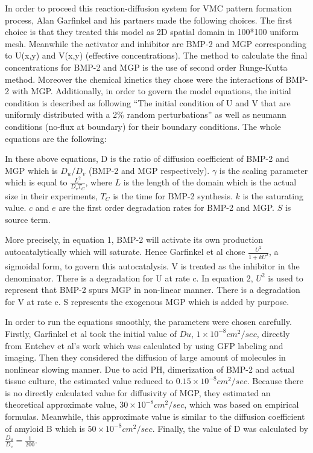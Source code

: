 \documentclass[12pt]{article}
\begin{document}
In order to proceed this reaction-diffusion system for VMC pattern formation process, Alan Garfinkel and his partners made the following choices. The first choice is that they treated this model as 2D spatial domain in 100*100 uniform mesh. Meanwhile the activator and inhibitor are BMP-2 and MGP corresponding to U(x,y) and V(x,y) (effective concentrations). The method to calculate the final concentrations for BMP-2 and MGP is the use of second order Runge-Kutta method. Moreover the chemical kinetics they chose were the interactions of BMP-2 with MGP. Additionally, in order to govern the model equations, the initial condition is described as following “The initial condition of U and V that are uniformly distributed with a 2\% random perturbations” as well as neumann conditions (no-flux at boundary) for their boundary conditions. The whole equations are the following:

In these above equations, D is the ratio of diffusion coefficient of BMP-2 and MGP which is $D_u / D_v$ (BMP-2 and MGP respectively). $\gamma$ is the scaling parameter which is equal to $\frac{L^2}{D_v T_C}$, where $L$ is the length of the domain which is the actual size in their experiments, $T_C$ is the time for BMP-2 synthesis. $k$ is the saturating value. $c$ and $e$ are the first order degradation rates for BMP-2 and MGP. $S$ is source term.

More precisely, in equation 1, BMP-2 will activate its own production autocatalytically which will saturate. Hence Garfinkel et al chose $\frac{U^2}{1+k U^2}$, a sigmoidal form, to govern this autocatalysis. V is treated as the inhibitor in the denominator. There is a degradation for U at rate c. In equation 2, $U^2$ is used to represent that BMP-2 spurs MGP in non-linear manner. There is a degradation for V at rate e. S represents the exogenous MGP which is added by purpose.

In order to run the equations smoothly, the parameters were chosen carefully. Firstly, Garfinkel et al took the initial value of $Du$, $1 \times 10^{-8} cm^2/sec$, directly from Entchev et al’s work which was calculated by using GFP labeling and imaging. Then they considered the diffusion of large amount of molecules in nonlinear slowing manner. Due to acid PH, dimerization of BMP-2 and actual tissue culture, the estimated value reduced to $0.15 \times 10^{-8} cm^2/sec$. Because there is no directly calculated value for diffusivity of MGP, they estimated an theoretical approximate value, $30 \times 10^{-8} cm^2/sec$, which was based on empirical formulas. Meanwhile, this approximate value is similar to the diffusion coefficient of amyloid B which is $50 \times 10^{-8} cm^2/sec$. Finally, the value of D was calculated by $\frac{D_u}{D_v} = \frac{1}{200}$.
\end{document}

